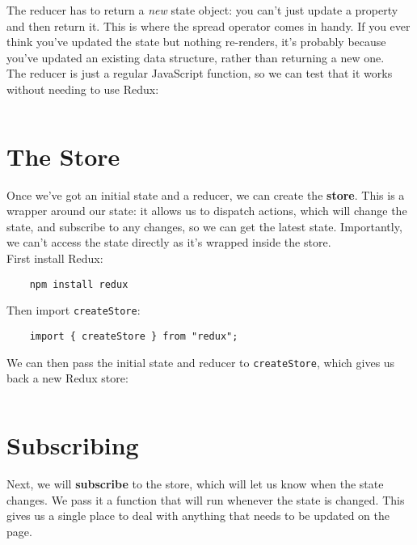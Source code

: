 \inputminted{jsx}{01/figures/02/03-reducer.js}

The reducer has to return a \textit{new} state object: you can't just update a property and then return it. This is where the spread operator comes in handy. If you ever think you've updated the state but nothing re-renders, it's probably because you've updated an existing data structure, rather than returning a new one.
\\

The reducer is just a regular JavaScript function, so we can test that it works without needing to use Redux:


\inputminted{jsx}{01/figures/02/04-reducer-test.js}


\section{The Store}

Once we've got an initial state and a reducer, we can create the \textbf{store}. This is a wrapper around our state: it allows us to dispatch actions, which will change the state, and subscribe to any changes, so we can get the latest state. Importantly, we can't access the state directly as it's wrapped inside the store.
\\

First install Redux:

\begin{verbatim}
    npm install redux
\end{verbatim}

Then import \texttt{createStore}:

\begin{verbatim}
    import { createStore } from "redux";
\end{verbatim}

We can then pass the initial state and reducer to \texttt{createStore}, which gives us back a new Redux store:

\inputminted{jsx}{01/figures/02/05-createStore.js}



\section{Subscribing}

Next, we will \textbf{subscribe} to the store, which will let us know when the state changes. We pass it a function that will run whenever the state is changed. This gives us a single place to deal with anything that needs to be updated on the page.
\\

